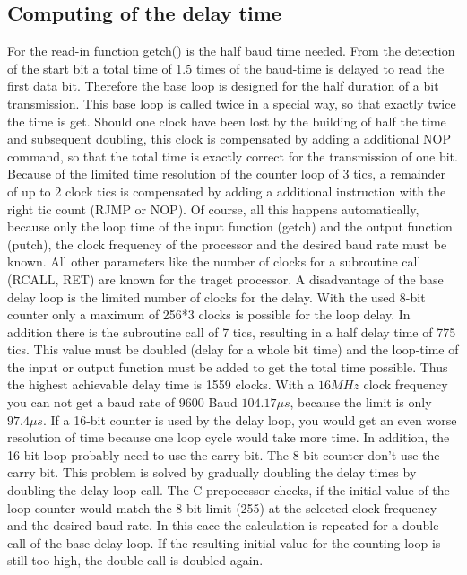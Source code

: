\subsection{Computing of the delay time}
For the read-in function getch() is the half baud time needed.
From the detection of the start bit a total time of 1.5 times of the baud-time is delayed
to read the first data bit.
Therefore the base loop is designed for the half duration of a bit transmission.
This base loop is called twice in a special way, so that exactly twice the time is get.
Should one clock have been lost by the building of half the time and subsequent doubling,
this clock is compensated by adding a additional NOP command, so that the total time
is exactly correct for the transmission of one bit.
Because of the limited time resolution of the counter loop of 3 tics, a remainder of up to 2 clock tics
is compensated by adding a additional instruction with the right tic count (RJMP or NOP).
Of course, all this happens automatically, because only the loop time of the input function (getch)
and the output function (putch), the clock frequency of the processor and the desired baud rate
must be known. All other parameters like the number of clocks for a subroutine call (RCALL, RET)
are known for the traget processor.
A disadvantage of the base delay loop is the limited number of clocks for the delay.
With the used 8-bit counter only a maximum of 256*3 clocks is possible for the loop delay.
In addition there is the subroutine call of 7 tics, resulting in a half delay time of 775 tics.
This value must be doubled (delay for a whole bit time) and the loop-time of the input or output
function must be added to get the total time possible. Thus the highest achievable delay time is 1559 clocks.
With a \(16 MHz\) clock frequency you can not get a baud rate of 9600 Baud \(104.17\mu s\), because
the limit is only \(97.4\mu s\).
If a 16-bit counter is used by the delay loop, you would get an even worse resolution of time
because one loop cycle would take more time.
In addition, the 16-bit loop probably need to use the carry bit. The 8-bit counter don't use the carry bit.
This problem is solved by gradually doubling the delay times by doubling the delay loop call.
The C-prepocessor checks, if the initial value of the loop counter would match the 8-bit limit (255) at the
selected clock frequency and the desired baud rate.
In this cace the calculation is repeated for a double call of the base delay loop.
If the resulting initial value for the counting loop is still too high, the double call is doubled again.
